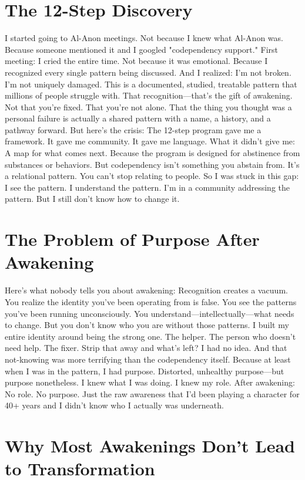 \section{The 12-Step Discovery}

I started going to Al-Anon meetings. Not because I knew what Al-Anon was. Because someone mentioned it and I googled "codependency support."
First meeting: I cried the entire time.
Not because it was emotional. Because I recognized every single pattern being discussed. And I realized: I'm not broken. I'm not uniquely damaged. This is a documented, studied, treatable pattern that millions of people struggle with.
That recognition—that's the gift of awakening.
Not that you're fixed. That you're not alone. That the thing you thought was a personal failure is actually a shared pattern with a name, a history, and a pathway forward.
But here's the crisis:
The 12-step program gave me a framework. It gave me community. It gave me language.
What it didn't give me: A map for what comes next.
Because the program is designed for abstinence from substances or behaviors. But codependency isn't something you abstain from. It's a relational pattern. You can't stop relating to people.
So I was stuck in this gap: I see the pattern. I understand the pattern. I'm in a community addressing the pattern. But I still don't know how to change it.

\section{The Problem of Purpose After Awakening}

Here's what nobody tells you about awakening:
Recognition creates a vacuum.
You realize the identity you've been operating from is false. You see the patterns you've been running unconsciously. You understand—intellectually—what needs to change.
But you don't know who you are without those patterns.
I built my entire identity around being the strong one. The helper. The person who doesn't need help. The fixer.
Strip that away and what's left?
I had no idea. And that not-knowing was more terrifying than the codependency itself.
Because at least when I was in the pattern, I had purpose. Distorted, unhealthy purpose—but purpose nonetheless. I knew what I was doing. I knew my role.
After awakening: No role. No purpose. Just the raw awareness that I'd been playing a character for 40+ years and I didn't know who I actually was underneath.

\section{Why Most Awakenings Don't Lead to Transformation}

